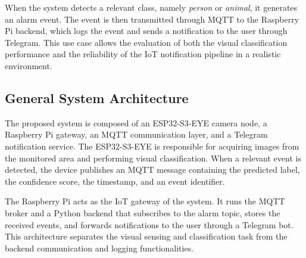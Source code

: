\documentclass{article}
\begin{document}
When the system detects a relevant class, namely \textit{person} or \textit{animal}, it generates an alarm event. The event is then transmitted through MQTT to the Raspberry Pi backend, which logs the event and sends a notification to the user through Telegram. This use case allows the evaluation of both the visual classification performance and the reliability of the IoT notification pipeline in a realistic environment.

\subsection{General System Architecture}

The proposed system is composed of an ESP32-S3-EYE camera node, a Raspberry Pi gateway, an MQTT communication layer, and a Telegram notification service. The ESP32-S3-EYE is responsible for acquiring images from the monitored area and performing visual classification. When a relevant event is detected, the device publishes an MQTT message containing the predicted label, the confidence score, the timestamp, and an event identifier.

The Raspberry Pi acts as the IoT gateway of the system. It runs the MQTT broker and a Python backend that subscribes to the alarm topic, stores the received events, and forwards notifications to the user through a Telegram bot. This architecture separates the visual sensing and classification task from the backend communication and logging functionalities.
\end{document}
